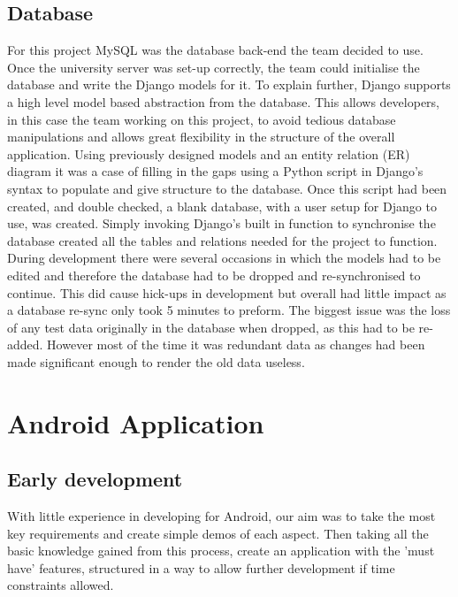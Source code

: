 \documentclass{l3proj}
\begin{document}
\subsection{Database}
For this project MySQL was the database back-end the team decided to use.
Once the university server was set-up correctly, the team could initialise the database and write the Django models for it. To explain further, Django supports a high level model based abstraction from the database. This allows developers, in this case the team working on this project, to avoid tedious database manipulations and allows great flexibility in the structure of the overall application.
Using previously designed models and an entity relation (ER) diagram it was a case of filling in the gaps using a Python script in Django's syntax to populate and give structure to the database.
Once this script had been created, and double checked, a blank database, with a user setup for Django to use, was created. Simply invoking Django's built in function to synchronise the database created all the tables and relations needed for the project to function.
During development there were several occasions in which the models had to be edited and therefore the database had to be dropped and re-synchronised to continue. This did cause hick-ups in development but overall had little impact as a database re-sync only took 5 minutes to preform. The biggest issue was the loss of any test data originally in the database when dropped, as this had to be re-added. However most of the time it was redundant data as changes had been made significant enough to render the old data useless.




\section{Android Application}

\subsection{Early development} With little experience in developing for Android, our aim was to take the most key requirements and create simple demos of each aspect. Then taking all the basic knowledge gained from this process, create an application with the 'must have' features, structured in a way to allow further development if time constraints allowed.
\end{document}
